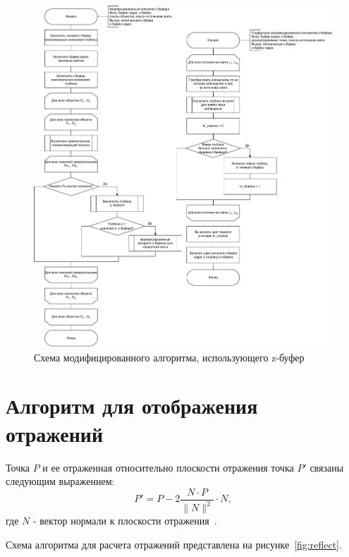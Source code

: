 \begin{figure}[h!]
	\centering
	\includegraphics[width=0.96\linewidth]{img/z_mod}
	\caption{Схема модифицированного алгоритма, использующего z-буфер}
	\label{fig:z_mod}
\end{figure}
\clearpage

\section{Алгоритм для отображения отражений}

Точка $P$ и ее отраженная относительно плоскости отражения точка $P'$ связаны следующим выражением: 
\begin{equation}
	\label{for:ref}
	P' = P - 2\frac{N \cdot P}{\|N\|^2} \cdot N,
\end{equation}
где $N$ - вектор нормали к плоскости отражения~\cite{refl}.

Схема алгоритма для расчета отражений представлена на рисунке~\ref{fig:reflect}.

